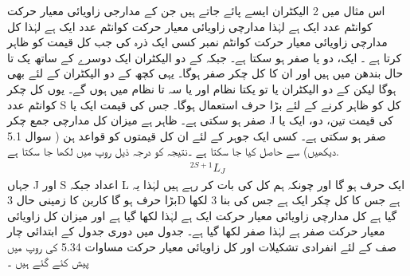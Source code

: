  اس مثال میں 2 الیکٹران ایسے پائے جاتے ہیں جن کے مدارجی زاویائی معیار حرکت کوانٹم  عدد ایک ہے لہٰذا مدارچی زاویائی معیار حرکت کوانٹم عدد ایک ہے لہٰذا کل مدارچی زاویائی معیار حرکت کوانٹم نمبر   کسی ایک ذرہ کی جب   کل قیمت کو ظاہر کرتا ہے ۔ ایک، دو یا صفر ہو  سکتا ہے۔ جبکہ    کے دو   الیکٹران ایک دوسرے کے ساتھ یک تا حال  بندھن میں  ہیں اور ان کا کل چکر صفر ہوگا۔ یہی کچھ   کے دو الیکٹران کے لئے بھی ہوگا لیکن    کے دو الیکٹران یا تو یکتا نظام اور یا سہ تا نظام میں ہوں گے۔ یوں کل چکر کوانٹم عدد S کل کو ظاہر کرنے کے لئے بڑا حرف استعمال ہوگا۔ جس کی قیمت ایک یا صفر ہو سکتی ہے۔ ظاہر ہے میزان کل مدارچی جمع چکر J کی قیمت تین، دو، ایک یا صفر ہو سکتی ہے۔ کسی ایک جوہر کے لئے ان کل قیمتوں کو  قواعد  ہن ( سوال 5.1 دیکھیں)  سے حاصل کیا جا سکتا ہے ۔نتیجہ کو درجہ ذیل روپ میں لکھا جا سکتا ہے. 
 \begin{align}
 ^{2S+1}L_{J}\end{align}
  جہاں J اور S اعداد جبکہ L ایک حرف ہو گا اور چونکہ ہم کل کی بات کر رہے ہیں لہٰذا یہ بڑا حرف ہو گا کاربن کا زمینی حال  3D ہے جس کا کل چکر ایک ہے جس کی بنا 3 لکھا گیا ہے کل مدارچی زاویائی معیار حرکت ایک ہے لہٰذا
      لکھا گیا ہے اور میزان  کل زاویائی معیار حرکت صفر ہے لہٰذا صفر لکھا گیا ہے۔ جدول    میں دوری جدول کے ابتدائی چار  صف  کے لئے انفرادی  تشکیلات  اور کل زاویائی معیار حرکت مساوات 5.34 کی روپ میں پیش کئے گئے ہیں ۔ 
